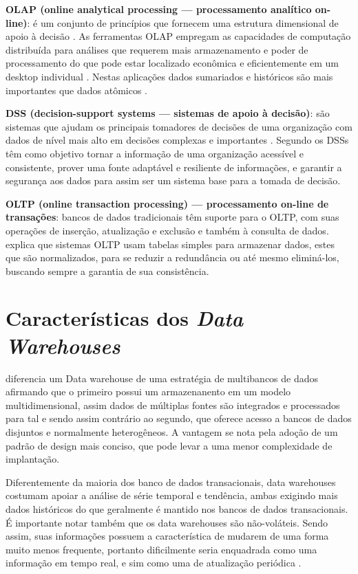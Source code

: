 \textbf{OLAP (online analytical processing — processamento analítico on-line)}:
é um conjunto de princípios que fornecem uma estrutura dimensional de apoio à decisão \cite{Kimball2002}. As ferramentas OLAP empregam as capacidades de computação distribuída para análises que requerem mais armazenamento e poder de processamento do que pode estar localizado econômica e eficientemente em um desktop individual \cite{elmasri_sistemas_2011}. Nestas aplicações dados sumariados e históricos são mais importantes que dados atômicos \cite{hilmer2002}.

\textbf{DSS (decision-support systems — sistemas de apoio à decisão)}:
são sistemas que ajudam os principais tomadores de decisões de uma organização com dados de nível mais alto em decisões complexas e importantes \cite{elmasri_sistemas_2011}. Segundo   os DSSs têm como objetivo tornar a informação de uma organização acessível e consistente, prover uma fonte adaptável e resiliente de informações, e garantir a segurança aos dados para assim ser um sistema base para a tomada de decisão.

\textbf{OLTP (online transaction processing) — processamento on-line de transações}:
bancos de dados tradicionais têm suporte para o OLTP, com suas operações de inserção, atualização e exclusão e também à consulta de dados.  explica que sistemas OLTP usam tabelas simples para armazenar dados, estes que são normalizados, para se reduzir a redundância ou até mesmo eliminá-los, buscando sempre a garantia de sua consistência.

\section{Características dos \textit{Data Warehouses}}\label{sec:caract-dw}


 diferencia um Data warehouse de uma estratégia de multibancos de dados afirmando que o primeiro possui um armazenanento em um modelo multidimensional, assim dados de múltiplas fontes são integrados e processados para tal e sendo assim contrário ao segundo, que oferece acesso a bancos de dados disjuntos e normalmente heterogêneos. A vantagem se nota pela adoção de um padrão de design mais conciso, que pode levar a uma menor complexidade de implantação.

Diferentemente da maioria dos banco de dados transacionais, data warehouses costumam apoiar a análise de série temporal e tendência, ambas exigindo mais dados históricos do que geralmente é mantido nos bancos de dados transacionais. É importante notar também que os data warehouses são não-voláteis. Sendo assim, suas informações possuem a característica de mudarem de uma forma muito menos frequente, portanto dificilmente seria enquadrada como uma informação em tempo real, e sim como uma de atualização periódica \cite{elmasri_sistemas_2011}.

